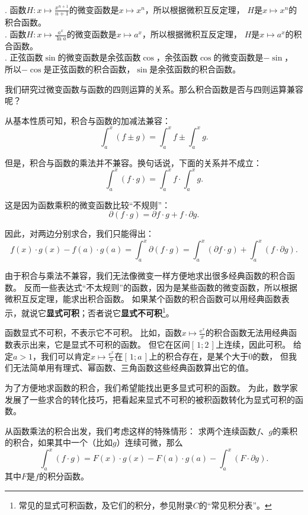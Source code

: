 \documentclass[12pt,UTF8,fontset=none]{ctexbook}
\begin{document}
\begin{so}
    \mbox{} \\
    . 函数$H: x\mapsto \frac{x^{n+1}}{n+1}$的微变函数是$x\mapsto x^n$，所以根据微积互反定理，
    $H$是$x\mapsto x^n$的积合函数。\\
    . 函数$H: x\mapsto \frac{a^x}{\ln{a}}$的微变函数是$x\mapsto a^x$，所以根据微积互反定理，
    $H$是$x\mapsto a^x$的积合函数。\\
    . 正弦函数$\sin$的微变函数是余弦函数$\cos$，余弦函数$\cos$的微变函数是$-\sin$，
    所以$-\cos$是正弦函数的积合函数，$\sin$是余弦函数的积合函数。
\end{so}

我们研究过微变函数与函数的四则运算的关系。那么积合函数是否与四则运算兼容呢？

从基本性质可知，积合与函数的加减法兼容：
$$ \int_a^x (f \pm g) = \int_a^x f \pm \int_a^x g. $$

但是，积合与函数的乘法并不兼容。换句话说，下面的关系并不成立：
$$ \int_a^x (f \cdot g) = \int_a^x f \cdot \int_a^x g. $$

这是因为函数乘积的微变函数比较“不规则”：
$$ \partial (f\cdot g) = \partial f \cdot g + f \cdot \partial g.$$

因此，对两边分别求合，我们只能得出：
$$ f(x)\cdot g(x) - f(a)\cdot g(a) = \int_a^x \partial (f\cdot g) = \int_a^x (\partial f \cdot g) + \int_a^x (f \cdot \partial g). $$

由于积合与乘法不兼容，我们无法像微变一样方便地求出很多经典函数的积合函数。
反而一些表达式“不太规则”的函数，因为是某些函数的微变函数，所以根据微积互反定理，能求出积合函数。
如果某个函数的积合函数可以用经典函数表示，就说它\textbf{显式可积}；否者说它\textbf{显式不可积}\footnote{常见的显式可积函数，及它们的积分，参见附录$C$的“常见积分表”。}。

函数显式不可积，不表示它不可积。
比如，函数$x\mapsto \frac{\mathrm{e}^x}{x}$的积合函数无法用经典函数表示出来，它是显式不可积的函数。
但它在区间$[\,1;2\,]$上连续，因此可积。
给定$a>1$，我们可以肯定$x\mapsto \frac{\mathrm{e}^x}{x}$在$[\,1; a\,]$上的积合存在，是某个大于$0$的数，
但我们无法简单用有理式、幂函数、三角函数这些经典函数算出它的值。

为了方便地求函数的积合，我们希望能找出更多显式可积的函数。
为此，数学家发展了一些求合的转化技巧，把看起来显式不可积的被积函数转化为显式可积的函数。

从函数乘法的积合出发，我们考虑这样的特殊情形：
求两个连续函数$f$、$g$的乘积的积合，如果其中一个（比如$g$）连续可微，那么
$$ \int_a^x (f \cdot g) = F(x)\cdot g(x) - F(a)\cdot g(a) - \int_a^x (F \cdot \partial g). $$
其中$F$是$f$的积分函数。
\end{document}
